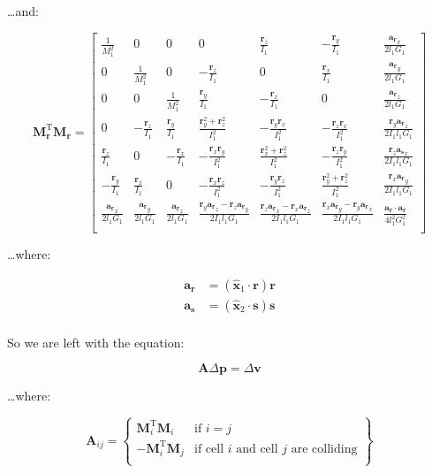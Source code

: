 \documentclass{report}
\renewcommand{\vec}[1]{\mathbf{#1}}
\let\oldhat\hat
\renewcommand{\hat}[1]{\oldhat{\mathbf{#1}}}
\newcommand{\deltav}{\Delta \vec{v}}
\newcommand{\deltap}{\Delta \vec{p}}
\begin{document}
\dots and:

\[
\vec{M}_\vec{r}^\textrm{T} \vec{M}_\vec{r}
=
\begin{bmatrix*}
\frac{1}{M_1^2} & 0 & 0 & 0 & \frac{\vec{r}_z}{I_1} & -\frac{\vec{r}_y}{I_1} & \frac{{\vec{a}_\vec{r}}_x}{2l_1G_1} \\
0 & \frac{1}{M_1^2} & 0 & -\frac{\vec{r}_z}{I_1} & 0 & \frac{\vec{r}_x}{I_1} & \frac{{\vec{a}_\vec{r}}_y}{2l_1G_1} \\
0 & 0 & \frac{1}{M_1^2} & \frac{\vec{r}_y}{I_1} & -\frac{\vec{r}_x}{I_1} & 0 & \frac{{\vec{a}_\vec{r}}_z}{2l_1G_1} \\
0 & -\frac{\vec{r}_z}{I_1} & \frac{\vec{r}_y}{I_1} & \frac{\vec{r}_y^2 + \vec{r}_z^2}{I_1^2} & -\frac{\vec{r}_y\vec{r}_x}{I_1^2} & -\frac{\vec{r}_z\vec{r}_x}{I_1^2} & \frac{\vec{r}_y{\vec{a}_\vec{r}}_z}{2I_1l_1G_1} \\
\frac{\vec{r}_z}{I_1} & 0 & -\frac{\vec{r}_x}{I_1} & -\frac{\vec{r}_x\vec{r}_y}{I_1^2} & \frac{\vec{r}_x^2 + \vec{r}_z^2}{I_1^2} & -\frac{\vec{r}_z\vec{r}_y}{I_1^2} & \frac{\vec{r}_z{\vec{a}_\vec{s}}_x}{2I_1l_1G_1} \\
-\frac{\vec{r}_y}{I_1} & \frac{\vec{r}_x}{I_1} & 0 & -\frac{\vec{r}_x\vec{r}_z}{I_1^2} & -\frac{\vec{r}_y\vec{r}_z}{I_1^2} & \frac{\vec{r}_y^2 + \vec{r}_z^2}{I_1^2} & \frac{\vec{r}_x{\vec{a}_\vec{r}}_y}{2I_1l_1G_1} \\
\frac{{\vec{a}_\vec{r}}_x}{2l_1G_1} & \frac{{\vec{a}_\vec{r}}_y}{2l_1G_1} & \frac{{\vec{a}_\vec{r}}_z}{2l_1G_1} &
\frac{\vec{r}_y{\vec{a}_\vec{r}}_z - \vec{r}_z{\vec{a}_\vec{r}}_y}{2I_1l_1G_1} &
\frac{\vec{r}_z{\vec{a}_\vec{r}}_x - \vec{r}_x{\vec{a}_\vec{r}}_z}{2I_1l_1G_1} &
\frac{\vec{r}_x{\vec{a}_\vec{r}}_y - \vec{r}_y{\vec{a}_\vec{r}}_x}{2I_1l_1G_1} &
\frac{\vec{a}_\vec{r} \cdot \vec{a}_\vec{r}}{4l_1^2G_1^2} \\
\end{bmatrix*}
\]

\dots where:

\begin{align*}
\vec{a}_\vec{r} &= \left(\hat{x}_1 \cdot \vec{r}\right) \vec{r} \\
\vec{a}_\vec{s} &= \left(\hat{x}_2 \cdot \vec{s}\right) \vec{s} \\
\end{align*}

So we are left with the equation:

\[
\vec{A}\deltap = \deltav
\]

\dots where:

\[
\vec{A}_{ij} = \left\{
  \begin{array}{ll}
    \vec{M}^\textrm{T}_i\vec{M}_i & \textrm{if } i = j \\
    -\vec{M}^\textrm{T}_i\vec{M}_j & \textrm{if cell } i \textrm{ and cell } j \textrm{ are colliding} \\
  \end{array}\right\}
\]
\end{document}
